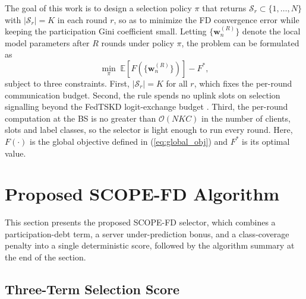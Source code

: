 \documentclass[journal]{IEEEtran}
\begin{document}
The goal of this work is to design a selection policy $\pi$ that returns $\mathcal{S}_r \subset \{1, \dots, N\}$ with $|\mathcal{S}_r| = K$ in each round $r$, so as to minimize the FD convergence error while keeping the participation Gini coefficient small. Letting $\{\bm{w}_n^{(R)}\}$ denote the local model parameters after $R$ rounds under policy $\pi$, the problem can be formulated as
\begin{equation}
\min_{\pi} \; \mathbb{E}\!\left[F\!\left(\{\bm{w}_n^{(R)}\}\right)\right] - F^{*},
\label{eq:problem}
\end{equation}
subject to three constraints. First, $|\mathcal{S}_r| = K$ for all $r$, which fixes the per-round communication budget. Second, the rule spends no uplink slots on selection signalling beyond the FedTSKD logit-exchange budget \cite{mu2024fedtskd}. Third, the per-round computation at the BS is no greater than $\mathcal{O}(NKC)$ in the number of clients, slots and label classes, so the selector is light enough to run every round. Here, $F(\cdot)$ is the global objective defined in (\ref{eq:global_obj}) and $F^{*}$ is its optimal value.

\section{Proposed SCOPE-FD Algorithm}
\label{sec:scope-alg}

This section presents the proposed SCOPE-FD selector, which combines a participation-debt term, a server under-prediction bonus, and a class-coverage penalty into a single deterministic score, followed by the algorithm summary at the end of the section.

\subsection{Three-Term Selection Score}
\label{ssec:three-term-score}
\end{document}

